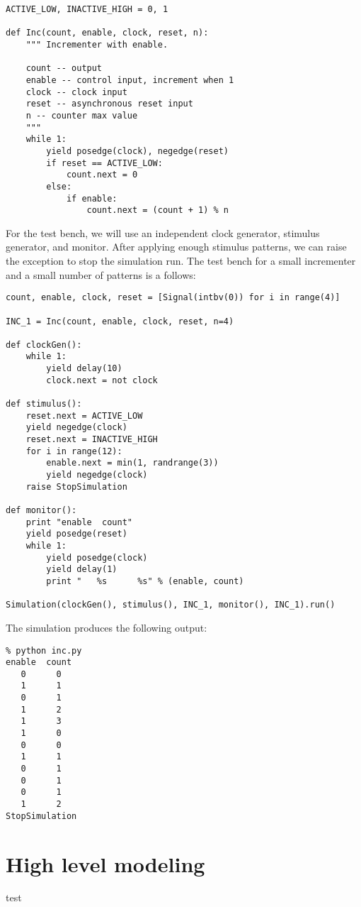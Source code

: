 \begin{verbatim}
ACTIVE_LOW, INACTIVE_HIGH = 0, 1

def Inc(count, enable, clock, reset, n):
    """ Incrementer with enable.
    
    count -- output
    enable -- control input, increment when 1
    clock -- clock input
    reset -- asynchronous reset input
    n -- counter max value
    """
    while 1:
        yield posedge(clock), negedge(reset)
        if reset == ACTIVE_LOW:
            count.next = 0
        else:
            if enable:
                count.next = (count + 1) % n

\end{verbatim}

For the test bench, we will use an independent clock generator, stimulus
generator, and monitor. After applying enough stimulus patterns, we
can raise the  exception to stop the
simulation run. The test bench for a small incrementer and a small
number of patterns is a follows:

\begin{verbatim}
count, enable, clock, reset = [Signal(intbv(0)) for i in range(4)]

INC_1 = Inc(count, enable, clock, reset, n=4)

def clockGen():
    while 1:
        yield delay(10)
        clock.next = not clock

def stimulus():
    reset.next = ACTIVE_LOW
    yield negedge(clock)
    reset.next = INACTIVE_HIGH
    for i in range(12):
        enable.next = min(1, randrange(3))
        yield negedge(clock)
    raise StopSimulation

def monitor():
    print "enable  count"
    yield posedge(reset)
    while 1:
        yield posedge(clock)
        yield delay(1)
        print "   %s      %s" % (enable, count)
        
Simulation(clockGen(), stimulus(), INC_1, monitor(), INC_1).run()

\end{verbatim}

The simulation produces the following output:
\begin{verbatim}
% python inc.py
enable  count
   0      0
   1      1
   0      1
   1      2
   1      3
   1      0
   0      0
   1      1
   0      1
   0      1
   0      1
   1      2
StopSimulation

\end{verbatim}


\section{High level modeling}

test
